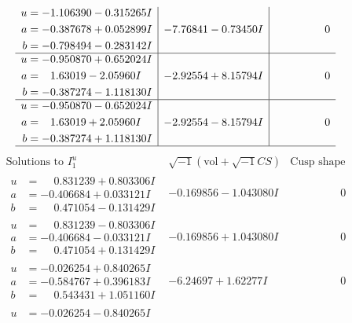 \documentclass[1p]{elsarticle_modified}
\theoremstyle{definition}
\newcommand{\I}{\sqrt{-1}}
\begin{document}
$$\begin{array}{c|c|c}
\begin{aligned}
u &= -1.106390 - 0.315265 I \\
a &= -0.387678 + 0.052899 I \\
b &= -0.798494 - 0.283142 I\end{aligned}
 & -7.76841 - 0.73450 I & \phantom{-0.000000 } 0 \\ \hline\begin{aligned}
u &= -0.950870 + 0.652024 I \\
a &= \phantom{-}1.63019 - 2.05960 I \\
b &= -0.387274 - 1.118130 I\end{aligned}
 & -2.92554 + 8.15794 I & \phantom{-0.000000 } 0 \\ \hline\begin{aligned}
u &= -0.950870 - 0.652024 I \\
a &= \phantom{-}1.63019 + 2.05960 I \\
b &= -0.387274 + 1.118130 I\end{aligned}
 & -2.92554 - 8.15794 I & \phantom{-0.000000 } 0\\
 \hline 
 \end{array}$$\newpage$$\begin{array}{c|c|c}  
\text{Solutions to }I^u_{1}& \I (\text{vol} + \sqrt{-1}CS) & \text{Cusp shape}\\
 \hline 
\begin{aligned}
u &= \phantom{-}0.831239 + 0.803306 I \\
a &= -0.406684 + 0.033121 I \\
b &= \phantom{-}0.471054 - 0.131429 I\end{aligned}
 & -0.169856 - 1.043080 I & \phantom{-0.000000 } 0 \\ \hline\begin{aligned}
u &= \phantom{-}0.831239 - 0.803306 I \\
a &= -0.406684 - 0.033121 I \\
b &= \phantom{-}0.471054 + 0.131429 I\end{aligned}
 & -0.169856 + 1.043080 I & \phantom{-0.000000 } 0 \\ \hline\begin{aligned}
u &= -0.026254 + 0.840265 I \\
a &= -0.584767 + 0.396183 I \\
b &= \phantom{-}0.543431 + 1.051160 I\end{aligned}
 & -6.24697 + 1.62277 I & \phantom{-0.000000 } 0 \\ \hline\begin{aligned}
u &= -0.026254 - 0.840265 I \\

\end{aligned}
\end{array}$$
\end{document}
